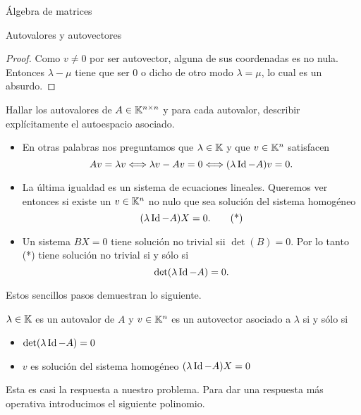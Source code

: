 \begin{chapter}{\'Algebra de matrices}
\begin{section}{Autovalores y autovectores}
\begin{proof}
        Como $v\neq0$ por ser autovector, alguna de sus coordenadas es no nula. Entonces $\lambda-\mu$ tiene que ser $0$ o dicho de otro modo $\lambda=\mu$, lo cual es un absurdo.
        \end{proof}
        
        
        \begin{problema*}
        Hallar los autovalores de $A\in\mathbb K^{n\times n}$ y para cada autovalor, describir explícitamente el autoespacio asociado.
    \end{problema*}
        
        \begin{itemize}
            \item En otras palabras nos preguntamos que $\lambda\in\mathbb K$ y  que $v\in\mathbb K^{n}$ satisfacen
            $$
            Av=\lambda v
            \Longleftrightarrow
            \lambda v-Av=0
            \Longleftrightarrow
            (\lambda \operatorname{Id}-A)v=0 .
            $$
            \item La última igualdad es un sistema de ecuaciones lineales. Queremos ver entonces si existe un $v\in\mathbb K^{n}$ no nulo que sea solución del sistema homogéneo
            \begin{equation*}
                (\lambda \operatorname{Id}-A)X=0.\tag{*}
            \end{equation*}
            \item  Un  sistema $BX =0$ tiene solución no trivial sii $\det(B)=0$. Por lo tanto (*) tiene  solución no trivial si y sólo si 
            $$
            \det(\lambda \operatorname{Id}-A)=0.
            $$ 
        \end{itemize}
        
        Estos sencillos pasos demuestran  lo siguiente.

        \begin{proposicion}
        $\lambda\in\mathbb K$ es un autovalor de $A$ y $v\in\mathbb K^n$ es un autovector asociado a $\lambda$ si y sólo si
    
        \begin{itemize}
            \item $\det(\lambda \operatorname{Id}-A)=0$
            \item $v$ es solución del sistema homogéneo $(\lambda \operatorname{Id}-A)X=0$
        \end{itemize}
    \end{proposicion}

        Esta es casi la respuesta a nuestro problema. Para dar una respuesta más operativa introducimos el siguiente polinomio.
    

\end{section}
\end{chapter}
